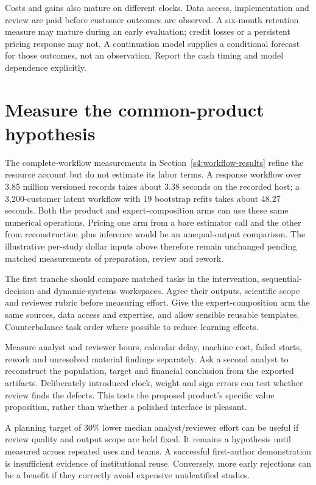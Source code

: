 Costs and gains also mature on different clocks. Data access,
implementation and review are paid before customer outcomes are
observed. A six-month retention measure may mature during an early
evaluation; credit losses or a persistent pricing response may not.
A continuation model supplies a conditional forecast for those outcomes,
not an observation. Report the cash timing and model dependence explicitly.

\section{Measure the common-product hypothesis}
\label{r3:adoption-experiment}

The complete-workflow measurements in Section~\ref{s4:workflow-results}
refine the resource account but do not estimate its labor terms. A response
workflow over 3.85 million versioned records takes about 3.38 seconds on the
recorded host; a 3,200-customer latent workflow with 19 bootstrap refits takes
about 48.27 seconds. Both the product and expert-composition arms can use
these same numerical operations. Pricing one arm from a bare estimator call
and the other from reconstruction plus inference would be an unequal-output
comparison. The illustrative per-study dollar inputs above therefore remain
unchanged pending matched measurements of preparation, review and rework.

The first tranche should compare matched tasks in the intervention,
sequential-decision and dynamic-systems workspaces. Agree their outputs,
scientific scope and reviewer rubric before measuring effort. Give the
expert-composition arm the same sources, data access and expertise, and
allow sensible reusable templates. Counterbalance task order where
possible to reduce learning effects.

Measure analyst and reviewer hours, calendar delay, machine cost,
failed starts, rework and unresolved material findings separately.
Ask a second analyst to reconstruct the population, target and financial
conclusion from the exported artifacts. Deliberately introduced clock,
weight and sign errors can test whether review finds the defects.
This tests the proposed product's specific value proposition, rather
than whether a polished interface is pleasant.

A planning target of 30\% lower median analyst/reviewer effort can be
useful if review quality and output scope are held fixed. It remains
a hypothesis until measured across repeated uses and teams. A successful
first-author demonstration is insufficient evidence of institutional
reuse. Conversely, more early rejections can be a benefit if they
correctly avoid expensive unidentified studies.

